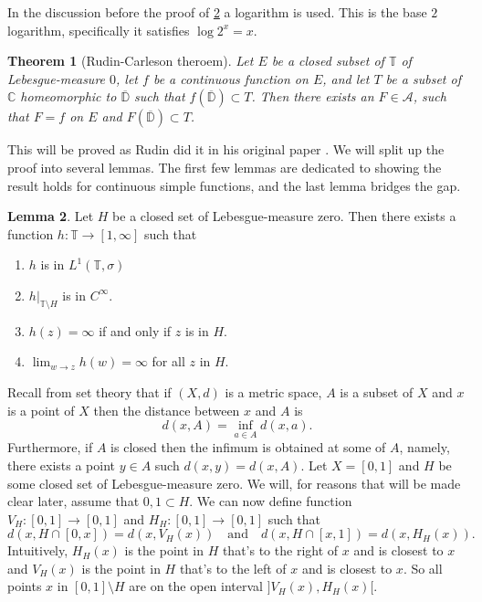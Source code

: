 \documentclass[a4paper,12pt,twoside,BCOR=10mm]{scrbook}
\newtheorem{theorem}{Theorem}[section]
\theoremstyle{definition}
\theoremstyle{definition}
\newtheorem{lemma}[theorem]{Lemma}
\theoremstyle{definition}
\begin{document}
In the discussion before the proof of \ref{mylemma} a logarithm is used.
This is the base $2$ logarithm, specifically it satisfies $\log 2^x = x$.

\begin{theorem}[Rudin-Carleson theroem]
\label{rudincarleson}
Let $E$ be a closed subset of $\mathbb{T}$ of Lebesgue-measure $0$,
	let $f$ be a continuous function on $E$,
	and let $T$ be a subset of $\mathbb{C}$ homeomorphic to $\overline{\mathbb{D}}$ such that $f(\overline{\mathbb{D}}) \subset T$.
Then there exists an $F \in \mathcal{A}$, such that $F = f$ on $E$ and $F(\overline{\mathbb{D}}) \subset T$.
\end{theorem}
This will be proved as Rudin did it in his original paper \citep{rudin}.
We will split up the proof into several lemmas.
The first few lemmas are dedicated to showing the result holds for continuous simple functions, and the last lemma bridges the gap.
\begin{lemma}
\label{mylemma}
Let $H$ be a closed set of Lebesgue-measure zero.
Then there exists a function $h: \mathbb{T} \rightarrow [1, \infty]$ such that 
\begin{enumerate}
\item
$h$ is in $L^1(\mathbb{T}, \sigma)$
\item
$h|_{\mathbb{T} \setminus H}$ is in $C^{\infty}$.
\item
$h(z) = \infty$ if and only if $z$ is in $H$.
\item
$\lim_{w \rightarrow z} h(w) = \infty$ for all $z$ in $H$.
\end{enumerate}
\end{lemma}
Recall from set theory that if $(X, d)$ is a metric space, $A$ is a subset of $X$ and $x$ is a point of $X$ then the distance between $x$ and $A$ is
\[
	d(x, A) = \inf_{a \in A} d(x, a).
\]
Furthermore, if $A$ is closed then the infimum is obtained at some of $A$, namely, there exists a point $y \in A$ such $d(x, y) = d(x, A)$.
Let $X = [0, 1]$ and $H$ be some closed set of Lebesgue-measure zero.
We will, for reasons that will be made clear later, assume that $0, 1 \subset H$.
We can now define function $V_H: [0, 1] \rightarrow [0, 1]$ and $H_H: [0, 1] \rightarrow [0, 1]$ such that
\[
	d(x, H \cap [0, x]) = d(x, V_H(x))
	\quad \text{and} \quad
	d(x, H \cap [x, 1]) = d(x, H_H(x)).
\]
Intuitively, $H_H(x)$ is the point in $H$ that's to the right of $x$ and is closest to $x$ and $V_H(x)$ is the point in $H$ that's to the left of $x$ and is closest to $x$.
So all points $x$ in $[0, 1] \setminus H$ are on the open interval $]V_H(x), H_H(x)[$.
\end{document}
